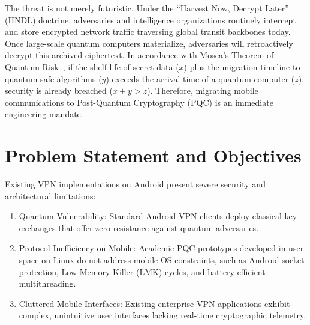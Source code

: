 The threat is not merely futuristic. Under the ``Harvest Now, Decrypt Later'' (HNDL) doctrine, adversaries and intelligence organizations routinely intercept and store encrypted network traffic traversing global transit backbones today. Once large-scale quantum computers materialize, adversaries will retroactively decrypt this archived ciphertext. In accordance with Mosca's Theorem of Quantum Risk~\cite{joseph2022transitioning,mosca2023threat}, if the shelf-life of secret data ($x$) plus the migration timeline to quantum-safe algorithms ($y$) exceeds the arrival time of a quantum computer ($z$), security is already breached ($x + y > z$). Therefore, migrating mobile communications to Post-Quantum Cryptography (PQC) is an immediate engineering mandate.

\section{Problem Statement and Objectives}
\label{sec:problem_statement}
\label{sec:project_objectives}

Existing VPN implementations on Android present severe security and architectural limitations:
\begin{enumerate}[label=(\roman*)]
    \item Quantum Vulnerability: Standard Android VPN clients deploy classical key exchanges that offer zero resistance against quantum adversaries.
    \item Protocol Inefficiency on Mobile: Academic PQC prototypes developed in user space on Linux do not address mobile OS constraints, such as Android socket protection, Low Memory Killer (LMK) cycles, and battery-efficient multithreading.
    \item Cluttered Mobile Interfaces: Existing enterprise VPN applications exhibit complex, unintuitive user interfaces lacking real-time cryptographic telemetry.
\end{enumerate}

